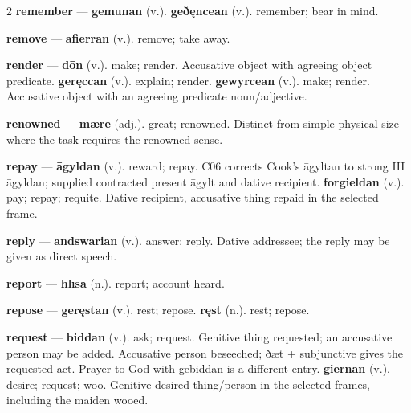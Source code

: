 \begin{multicols}{2}
\textbf{remember} — \textbf{gemunan} (v.).  \textbf{geðęncean} (v.). remember; bear in mind.\par
\textbf{remove} — \textbf{āfierran} (v.). remove; take away.\par
\textbf{render} — \textbf{dōn} (v.). make; render. Accusative object with agreeing object predicate. \textbf{geręccan} (v.). explain; render. \textbf{gewyrcean} (v.). make; render. Accusative object with an agreeing predicate noun/adjective.\par
\textbf{renowned} — \textbf{mǣre} (adj.). great; renowned. Distinct from simple physical size where the task requires the renowned sense.\par
\textbf{repay} — \textbf{āgyldan} (v.). reward; repay. C06 corrects Cook's āgyltan to strong III āgyldan; supplied contracted present āgylt and dative recipient. \textbf{forgieldan} (v.). pay; repay; requite. Dative recipient, accusative thing repaid in the selected frame.\par
\textbf{reply} — \textbf{andswarian} (v.). answer; reply. Dative addressee; the reply may be given as direct speech.\par
\textbf{report} — \textbf{hlīsa} (n.). report; account heard.\par
\textbf{repose} — \textbf{geręstan} (v.). rest; repose. \textbf{ręst} (n.). rest; repose.\par
\textbf{request} — \textbf{biddan} (v.). ask; request. Genitive thing requested; an accusative person may be added. Accusative person beseeched; ðæt + subjunctive gives the requested act. Prayer to God with gebiddan is a different entry. \textbf{giernan} (v.). desire; request; woo. Genitive desired thing/person in the selected frames, including the maiden wooed.\par

\end{multicols}
